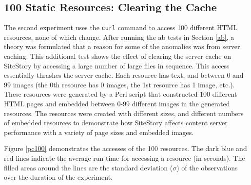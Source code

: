 \documentclass[runningheads,a4paper]{llncs}
\begin{document}
\subsection{100 Static Resources: Clearing the Cache}
\label{static}
\vskip -3mm
The second experiment uses the \texttt{curl} command to access 100 different HTML resources, none of which change. After running the ab tests in Section \ref{ab}, a theory was formulated that a reason for some of the anomalies was from server caching.  This additional test shows the effect of clearing the server cache on SiteStory by accessing a large number of large files in sequence. This access essentially thrashes the server cache. Each resource has text, and between 0 and 99 images (the 0th resource has 0 images, the 1st resource has 1 image, etc.). These resources were generated by a Perl script that constructed 100 different HTML pages and embedded between 0-99 different images in the generated resources. The resources were created with different sizes, and different numbers of embedded resources to demonstrate how SiteStory affects content server performance with a variety of page sizes and embedded images.

Figure \ref{pc100} demonstrates the accesses of the 100 resources. The dark blue and red lines indicate the average run time for accessing a resource (in seconds). The filled areas around the lines are the standard deviation ($\sigma$) of the observations over the duration of the experiment.
\end{document}
